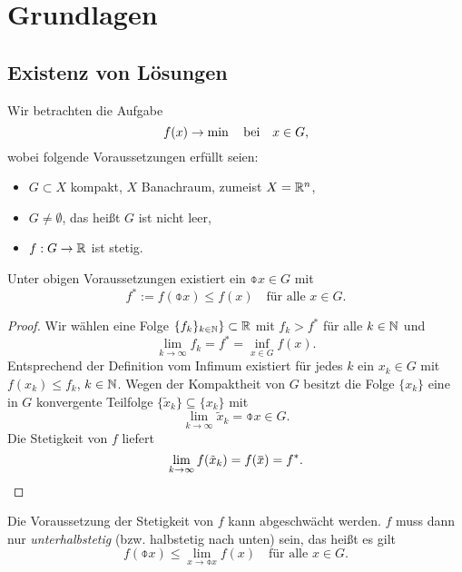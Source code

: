 \section{Grundlagen}
\subsection{Existenz von Lösungen}
Wir betrachten die Aufgabe
\begin{equation}
  f(x) \to \min \quad \text{bei} \quad x \in G,
\end{equation}
wobei folgende Voraussetzungen erfüllt seien:
\begin{itemize}
\item $G \subset X$ kompakt, $X$ Banachraum, zumeist $X = \mathbb{R}^n$,
\item $G \ne \emptyset$, das heißt $G$ ist nicht leer,
\item $f: G \to \mathbb{R}$ ist stetig.
\end{itemize}

\begin{thm}
  Unter obigen Voraussetzungen existiert ein $\obar{x} \in G$ mit
  \[ f^* := f( \obar{x} ) \le f(x) \quad \text{für alle } x \in G. \]
\end{thm}

\begin{proof}
  Wir wählen eine Folge $\{f_k\}_{k \in \mathbb{N}}\} \subset \mathbb{R}$ mit $f_k > f^*$
  für alle $k \in \mathbb{N}$ und
  \[ \lim_{k \to \infty} f_k = f^* = \inf_{x \in G} f(x). \]
  Entsprechend der Definition vom Infimum existiert für jedes $k$ ein
  $x_k \in G$ mit $f(x_k) \le f_k$, $k \in \mathbb{N}$. Wegen der Kompaktheit von $G$
  besitzt die Folge $\{x_k\}$ eine in $G$ konvergente Teilfolge $\{ \tilde{x}_k \}
  \subseteq \{ x_k \}$ mit
  \[ \lim_{k \to \infty} \tilde{x}_k = \obar{x} \in G. \]
  Die Stetigkeit von $f$ liefert
  \[ \lim_{k \to \infty} f(\tilde{x}_k) = f(\obar{x}) = f^*. \qedhere \]
\end{proof}

\begin{rmrk}
  Die Voraussetzung der Stetigkeit von $f$ kann abgeschwächt werden. $f$ muss
  dann nur \emph{unterhalbstetig} (bzw. halbstetig nach unten) sein, das heißt
  es gilt
  \[ f( \obar{x} ) \le \lim_{x \to \obar{x}} f(x) \quad \text{für alle } x \in
    G. \]
\end{rmrk}

